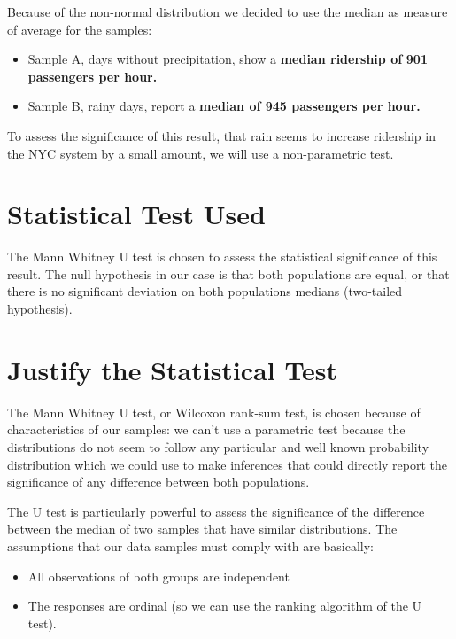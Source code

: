 \documentclass[letterpaper,10pt,english]{sphinxmanual}
\begin{document}
Because of the non-normal distribution we decided to use the median as measure
of average for the samples:
\begin{itemize}
\item {} 
Sample A, days without precipitation, show a \textbf{median ridership of}
\textbf{901 passengers per hour.}

\item {} 
Sample B, rainy days, report a \textbf{median of 945 passengers per hour.}

\end{itemize}

To assess the significance of this result, that rain seems to increase ridership
in the NYC system by a small amount, we will use a non-parametric test.


\section{Statistical Test Used}
\label{section1:statistical-test-used}
The Mann Whitney U test is chosen to assess the statistical significance of this
result. The null hypothesis in our case is that both populations are equal, or
that there is no significant deviation on both populations medians (two-tailed
hypothesis).


\section{Justify the Statistical Test}
\label{section1:justify-the-statistical-test}
The Mann Whitney U test, or Wilcoxon rank-sum test, is chosen because of
characteristics of our samples: we can't use a parametric test because the
distributions do not seem to follow any particular and well known probability
distribution which we could use to make inferences that could directly report the
significance of any difference between both populations.

The U test is particularly powerful to assess the significance of the difference
between the median of two samples that have similar distributions. The assumptions
that our data samples must comply with are basically:
\begin{itemize}
\item {} 
All observations of both groups are independent

\item {} 
The responses are ordinal (so we can use the ranking algorithm of the U test).

\end{itemize}
\end{document}

